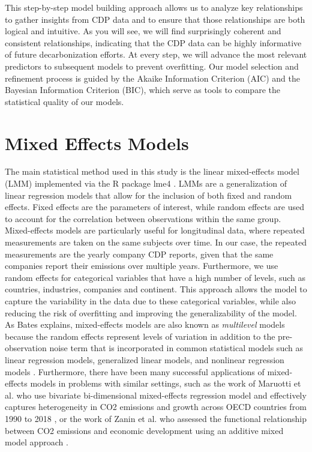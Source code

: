 This step-by-step model building approach allows us to analyze key relationships to gather insights from CDP data and to ensure that those relationships are both logical and intuitive. As you will see, we will find surprisingly coherent and consistent relationships, indicating that the CDP data can be highly informative of future decarbonization efforts. At every step, we will advance the most relevant predictors to subsequent models to prevent overfitting. Our model selection and refinement process is guided by the Akaike Information Criterion (AIC) and the Bayesian Information Criterion (BIC), which serve as tools to compare the statistical quality of our models.

\section{Mixed Effects Models}

The main statistical method used in this study is the linear mixed-effects model (LMM) implemented via the R package lme4 \cite{lmer}. LMMs are a generalization of linear regression models that allow for the inclusion of both fixed and random effects. Fixed effects are the parameters of interest, while random effects are used to account for the correlation between observations within the same group. Mixed-effects models are particularly useful for longitudinal data, where repeated measurements are taken on the same subjects over time. In our case, the repeated measurements are the yearly company CDP reports, given that the same companies report their emissions over multiple years. Furthermore, we use random effects for categorical variables that have a high number of levels, such as countries, industries, companies and continent. This approach allows the model to capture the variability in the data due to these categorical variables, while also reducing the risk of overfitting and improving the generalizability of the model. As Bates explains, mixed-effects models are also known as \textit{multilevel} models because the random effects represent levels of variation in addition to the pre-observation noise term that is incorporated in common statistical models such as linear regression models, generalized linear models, and nonlinear regression models \cite{bates}. Furthermore, there have been many successful applications of mixed-effects models in problems with similar settings, such as the work of Maruotti et al. who use bivariate bi-dimensional mixed-effects regression model and effectively captures heterogeneity in CO2 emissions and growth across OECD countries from 1990 to 2018 \cite{Maruotti2023CO2}, or the work of Zanin et al. who assessed the functional relationship between CO2 emissions and economic development using an additive mixed model approach \cite{zanin}.

